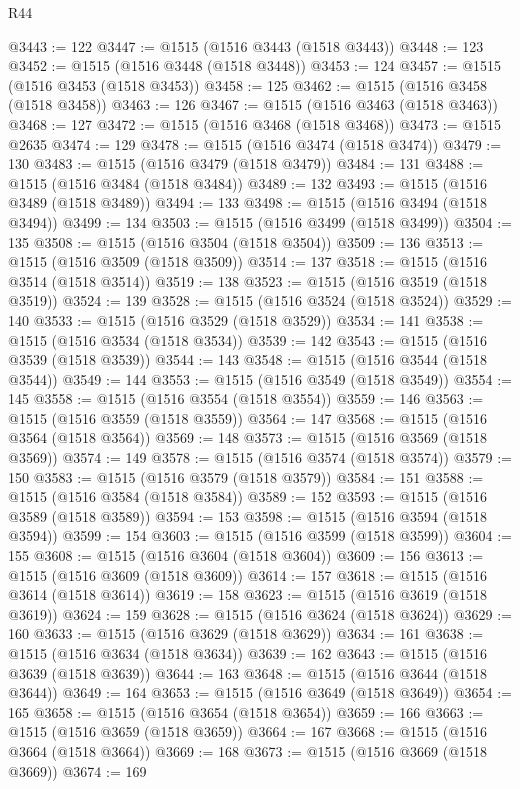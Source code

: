 \begin{lexlean}{R44}
\begin{coremodule}
{@3443 := 122
@3447 := @1515 (@1516 @3443 (@1518 @3443))
@3448 := 123
@3452 := @1515 (@1516 @3448 (@1518 @3448))
@3453 := 124
@3457 := @1515 (@1516 @3453 (@1518 @3453))
@3458 := 125
@3462 := @1515 (@1516 @3458 (@1518 @3458))
@3463 := 126
@3467 := @1515 (@1516 @3463 (@1518 @3463))
@3468 := 127
@3472 := @1515 (@1516 @3468 (@1518 @3468))
@3473 := @1515 @2635
@3474 := 129
@3478 := @1515 (@1516 @3474 (@1518 @3474))
@3479 := 130
@3483 := @1515 (@1516 @3479 (@1518 @3479))
@3484 := 131
@3488 := @1515 (@1516 @3484 (@1518 @3484))
@3489 := 132
@3493 := @1515 (@1516 @3489 (@1518 @3489))
@3494 := 133
@3498 := @1515 (@1516 @3494 (@1518 @3494))
@3499 := 134
@3503 := @1515 (@1516 @3499 (@1518 @3499))
@3504 := 135
@3508 := @1515 (@1516 @3504 (@1518 @3504))
@3509 := 136
@3513 := @1515 (@1516 @3509 (@1518 @3509))
@3514 := 137
@3518 := @1515 (@1516 @3514 (@1518 @3514))
@3519 := 138
@3523 := @1515 (@1516 @3519 (@1518 @3519))
@3524 := 139
@3528 := @1515 (@1516 @3524 (@1518 @3524))
@3529 := 140
@3533 := @1515 (@1516 @3529 (@1518 @3529))
@3534 := 141
@3538 := @1515 (@1516 @3534 (@1518 @3534))
@3539 := 142
@3543 := @1515 (@1516 @3539 (@1518 @3539))
@3544 := 143
@3548 := @1515 (@1516 @3544 (@1518 @3544))
@3549 := 144
@3553 := @1515 (@1516 @3549 (@1518 @3549))
@3554 := 145
@3558 := @1515 (@1516 @3554 (@1518 @3554))
@3559 := 146
@3563 := @1515 (@1516 @3559 (@1518 @3559))
@3564 := 147
@3568 := @1515 (@1516 @3564 (@1518 @3564))
@3569 := 148
@3573 := @1515 (@1516 @3569 (@1518 @3569))
@3574 := 149
@3578 := @1515 (@1516 @3574 (@1518 @3574))
@3579 := 150
@3583 := @1515 (@1516 @3579 (@1518 @3579))
@3584 := 151
@3588 := @1515 (@1516 @3584 (@1518 @3584))
@3589 := 152
@3593 := @1515 (@1516 @3589 (@1518 @3589))
@3594 := 153
@3598 := @1515 (@1516 @3594 (@1518 @3594))
@3599 := 154
@3603 := @1515 (@1516 @3599 (@1518 @3599))
@3604 := 155
@3608 := @1515 (@1516 @3604 (@1518 @3604))
@3609 := 156
@3613 := @1515 (@1516 @3609 (@1518 @3609))
@3614 := 157
@3618 := @1515 (@1516 @3614 (@1518 @3614))
@3619 := 158
@3623 := @1515 (@1516 @3619 (@1518 @3619))
@3624 := 159
@3628 := @1515 (@1516 @3624 (@1518 @3624))
@3629 := 160
@3633 := @1515 (@1516 @3629 (@1518 @3629))
@3634 := 161
@3638 := @1515 (@1516 @3634 (@1518 @3634))
@3639 := 162
@3643 := @1515 (@1516 @3639 (@1518 @3639))
@3644 := 163
@3648 := @1515 (@1516 @3644 (@1518 @3644))
@3649 := 164
@3653 := @1515 (@1516 @3649 (@1518 @3649))
@3654 := 165
@3658 := @1515 (@1516 @3654 (@1518 @3654))
@3659 := 166
@3663 := @1515 (@1516 @3659 (@1518 @3659))
@3664 := 167
@3668 := @1515 (@1516 @3664 (@1518 @3664))
@3669 := 168
@3673 := @1515 (@1516 @3669 (@1518 @3669))
@3674 := 169
}
\end{coremodule}
\end{lexlean}
